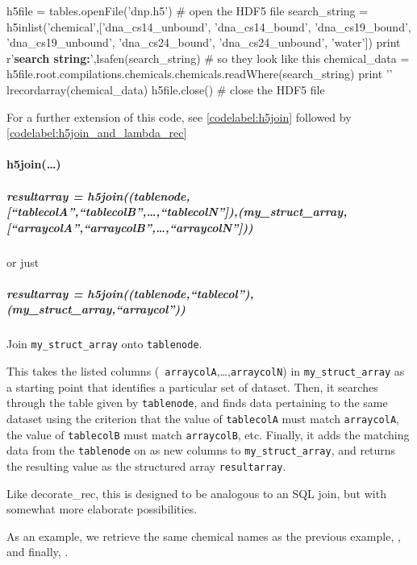 \label{codelabel:h5inlist}
\begin{python}
h5file = tables.openFile('dnp.h5') # open the HDF5 file
search_string = h5inlist('chemical',['dna_cs14_unbound',
    'dna_cs14_bound',
    'dna_cs19_bound',
    'dna_cs19_unbound',
    'dna_cs24_bound',
    'dna_cs24_unbound',
    'water'])
print r'\textbf{search string:}',lsafen(search_string) # so they look like this
chemical_data = h5file.root.compilations.chemicals.chemicals.readWhere(search_string)
print '\n{}\n\n'
lrecordarray(chemical_data)
h5file.close() # close the HDF5 file
\end{python}

For a further extension of this code, see \ref{codelabel:h5join} followed by \ref{codelabel:h5join_and_lambda_rec}
\paragraph{h5join(\ldots)}\label{sec:writeup_software_h5inlist}
\subparagraph{resultarray = h5join((tablenode,[``tablecolA'',``tablecolB'',\ldots,``tablecolN'']),(my\_struct\_array,[``arraycolA'',``arraycolB'',\ldots,``arraycolN'']))}

or just

\subparagraph{resultarray = h5join((tablenode,``tablecol''),(my\_struct\_array,``arraycol''))}

Join \texttt{my\_struct\_array} onto \texttt{tablenode}.

This takes the listed columns (\ie~\texttt{arraycolA},\ldots,\texttt{arraycolN}) in
    \texttt{my\_struct\_array} as a starting point that identifies a
    particular set of dataset.
Then, it searches through the table given by \texttt{tablenode}, and finds
    data pertaining to the same dataset using the criterion that
    the value of \texttt{tablecolA} must match \texttt{arraycolA}, the value of
    \texttt{tablecolB} must match \texttt{arraycolB}, etc.
Finally, it adds the matching data from the \texttt{tablenode} on as new
    columns to \texttt{my\_struct\_array}, and returns the resulting value
    as the structured array \texttt{resultarray}.

Like decorate\_rec, this is designed to be analogous to an SQL
    join, but with somewhat more elaborate possibilities.

As an example, we retrieve the same chemical names as the
    previous example, , and finally, .

